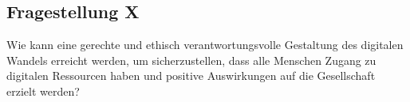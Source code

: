 \documentclass[journal]{IEEEtran}
\begin{document}
\begin{onecolumn}
\section*{Fragestellung X}

Wie kann eine gerechte und ethisch verantwortungsvolle Gestaltung des digitalen Wandels erreicht werden,
um sicherzustellen, dass alle Menschen Zugang zu digitalen Ressourcen haben und positive Auswirkungen auf
die Gesellschaft erzielt werden?

\end{onecolumn}
\end{document}
